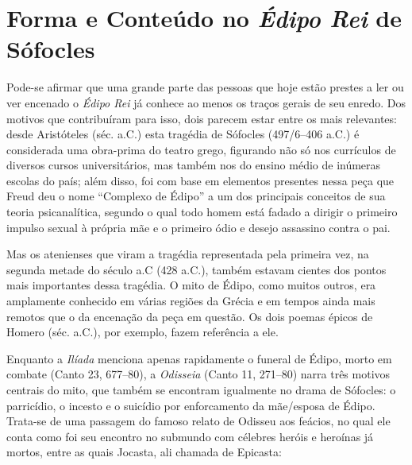 \label{introduuxe7uxe3o}

\section{Forma e Conteúdo no \emph{Édipo Rei} de Sófocles}

Pode-se afirmar que uma grande parte das pessoas que hoje estão prestes
a ler ou ver encenado o \emph{Édipo Rei} já conhece ao menos os traços
gerais de seu enredo. Dos motivos que contribuíram para isso, dois
parecem estar entre os mais relevantes: desde Aristóteles (séc.  a.C.) 
esta tragédia de Sófocles (497/6--406 a.C.) é considerada uma
obra-prima do teatro grego, figurando não só nos currículos de diversos
cursos universitários, mas também nos do ensino médio de inúmeras
escolas do país; além disso, foi com base em elementos presentes nessa
peça que Freud deu o nome ``Complexo de Édipo'' a um dos principais
conceitos de sua teoria psicanalítica, segundo o qual todo homem está
fadado a dirigir o primeiro impulso sexual à própria mãe e o primeiro
ódio e desejo assassino contra o pai.

Mas os atenienses que viram a tragédia representada pela primeira vez,
na segunda metade do século  a.C (428 a.C.), também estavam cientes
dos pontos mais importantes dessa tragédia. O mito de Édipo, como muitos
outros, era amplamente conhecido em várias regiões da Grécia e em tempos
ainda mais remotos que o da encenação da peça em questão. Os dois poemas
épicos de Homero (séc.  a.C.), por exemplo, fazem referência a ele.

Enquanto a \emph{Ilíada} menciona apenas rapidamente o funeral de Édipo,
morto em combate (Canto 23, 677--80), a \emph{Odisseia} (Canto 11,
271--80) narra três motivos centrais do mito, que também se encontram
igualmente no drama de Sófocles: o parricídio, o incesto e o suicídio
por enforcamento da mãe/esposa de Édipo. Trata-se de uma passagem do
famoso relato de Odisseu aos feácios, no qual ele conta como foi seu
encontro no submundo com célebres heróis e heroínas já mortos, entre as
quais Jocasta, ali chamada de Epicasta:


